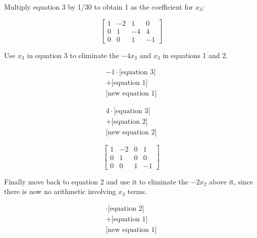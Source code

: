 \documentclass{article}
\begin{document}
Multiply equation 3 by 1/30 to obtain 1 as the coefficient for $x_3$:

\begin{equation}
    \begin{bmatrix}
        1 & -2 & 1 & 0\\
        0 & 1 & -4 & 4\\
        0 & 0 & 1 & -1
    \end{bmatrix}
\end{equation}

Use $x_3$ in equation 3 to eliminate the $-4x_3$ and $x_3$ in equations 1 and 2.

\begin{equation*}
    \begin{split}
        -1\cdot\text{[equation 3]}\\
        +\text{[equation 1]}\\
        \hline
        \text{[new equation 1]}
    \end{split}
\end{equation*}

\begin{equation*}
    \begin{split}
        4\cdot\text{[equation 3]}\\
        +\text{[equation 2]}\\
        \hline
        \text{[new equation 2]}
    \end{split}
\end{equation*}

\begin{equation}
    \begin{bmatrix}
        1 & -2 & 0 & 1\\
        0 & 1 & 0 & 0\\
        0 & 0 & 1 & -1
    \end{bmatrix}
\end{equation}

Finally move back to equation 2 and use it to eliminate the $-2x_2$ above it, since there is now no arithmetic involving $x_3$ terms.

\begin{equation*}
    \begin{split}
        \cdot\text{[equation 2]}\\
        +\text{[equation 1]}\\
        \hline
        \text{[new equation 1]}
    \end{split}
\end{equation*}
\end{document}
